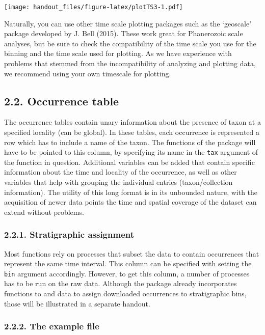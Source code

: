 \documentclass[]{article}
\begin{document}
\texttt{[image: handout\_files/figure-latex/plotTS3-1.pdf]}

Naturally, you can use other time scale plotting packages such as the
`geoscale' package developed by J. Bell (2015). These work great for
Phanerozoic scale analyses, but be sure to check the compatibility of
the time scale you use for the binning and the time scale used for
plotting. As we have experience with problems that stemmed from the
incompatibility of analyzing and plotting data, we recommend using your
own timescale for plotting.

\hypertarget{occurrence-table}{%
\subsection{2.2. Occurrence table}\label{occurrence-table}}

The occurrence tables contain unary information about the presence of
taxon at a specified locality (can be global). In these tables, each
occurrence is represented a row which has to include a name of the
taxon. The functions of the package will have to be pointed to this
column, by specifying its name in the \texttt{tax} argument of the
function in question. Additional variables can be added that contain
specific information about the time and locality of the occurrence, as
well as other variables that help with grouping the individual entries
(taxon/collection information). The utility of this long format is in
its unbounded nature, with the acquisition of newer data points the time
and spatial coverage of the dataset can extend without problems.

\hypertarget{stratigraphic-assignment}{%
\subsubsection{2.2.1. Stratigraphic
assignment}\label{stratigraphic-assignment}}

Most functions rely on processes that subset the data to contain
occurrences that represent the same time interval. This column can be
specified with setting the \texttt{bin} argument accordingly. However,
to get this column, a number of processes has to be run on the raw data.
Although the package already incorporates functions to and data to
assign downloaded occurrences to stratigraphic bins, those will be
illustrated in a separate handout.

\hypertarget{the-example-file}{%
\subsubsection{2.2.2. The example file}\label{the-example-file}}
\end{document}
